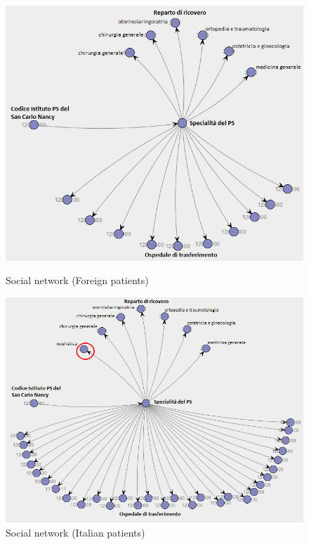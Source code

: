 \begin{figure} [htbp]
\begin{minipage}[t]{0.5\textwidth}
\includegraphics[width=\textwidth , keepaspectratio]{ProntoSoccorsoHoWForeigns}
\caption{Social network (Foreign patients)}
\end{minipage}
\begin{minipage}[t]{0.5\textwidth}
\includegraphics[width=1.125\textwidth , keepaspectratio]{ProntoSoccorsoHoWItalians}
\caption{Social network (Italian patients)}
\end{minipage}
\end{figure}
